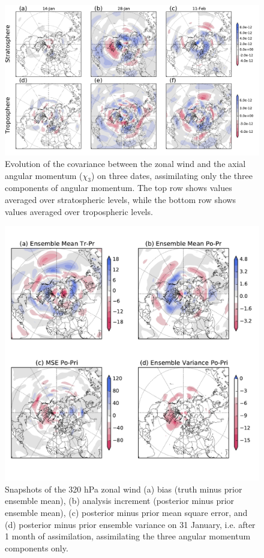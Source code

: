  \begin{figure}
	 \includegraphics[width=\textwidth]{Paper_figures/ERPDA_paper_U_to_LOD_covariances_.pdf}
	 \caption{Evolution of the covariance between the zonal wind and the axial angular momentum ($\chi_3$) on three dates, assimilating only the three components of angular momentum. The top row shows values averaged over stratospheric levels, while the bottom row shows values averaged over tropospheric levels.}
 \label{fig:covariances}
\end{figure}

 \begin{figure}
	 \includegraphics[width=\textwidth]{Paper_figures/ERPDA_paper_U_priorerror_vs_increment_vs_ER_31jan.pdf}
	 \caption{Snapshots of the 320 hPa zonal wind (a) bias (truth minus prior ensemble mean), (b) analysis increment (posterior minus prior ensemble mean), (c) posterior minus prior mean square error, and (d) posterior minus prior ensemble variance on 31 January, i.e. after 1 month of assimilation, assimilating the three angular momentum components only. } 
 \label{fig:error_increments}
\end{figure}



